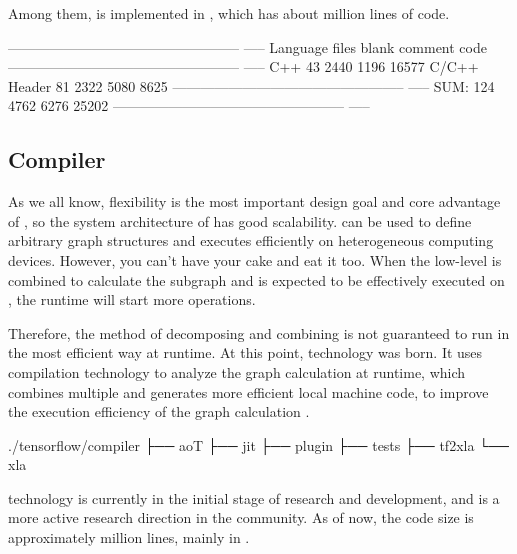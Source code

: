 \begin{content}
Among them,  is implemented in , which has about  million lines of code.

\begin{leftbar}
\begin{python}[caption={StreamExecutorCode Statistics}]
-------------------------------------------------- -----
Language            files     blank   comment      code
-------------------------------------------------- -----
C++                    43      2440      1196     16577
C/C++ Header           81      2322      5080      8625
-------------------------------------------------- -----
SUM:                  124      4762      6276     25202
-------------------------------------------------- -----
\end{python}
\end{leftbar}


\subsection{Compiler}
As we all know, flexibility is the most important design goal and core advantage of \tf{}, so the system architecture of \tf{} has good scalability. \tf{} can be used to define arbitrary graph structures and executes efficiently on heterogeneous computing devices. However, you can't have your cake and eat it too. When the low-level  is combined to calculate the subgraph and is expected to be effectively executed on , the runtime will start more  operations.

Therefore, the \tf{} method of decomposing and combining  is not guaranteed to run in the most efficient way at runtime. At this point,  technology was born. It uses  compilation technology to analyze the graph calculation at runtime, which combines multiple  and generates more efficient local machine code, to improve the execution efficiency of the graph calculation .

\begin{leftbar}
\begin{python}[caption={CompilerSource Structure}]
./tensorflow/compiler
├── aoT
├── jit
├── plugin
├── tests
├── tf2xla
└── xla
\end{python}
\end{leftbar}

 technology is currently in the initial stage of research and development, and is a more active research direction in the community. As of now, the code size is approximately  million lines, mainly in .


\end{content}
